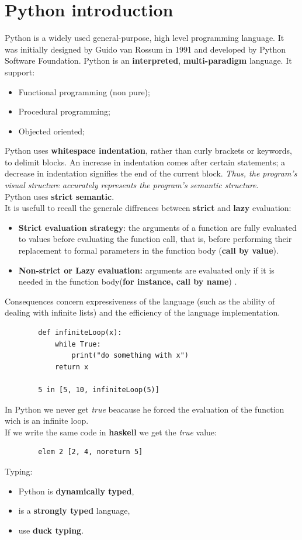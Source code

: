 \documentclass[12pt]{article}
\begin{document}
\section{Python introduction}
	Python is a widely used general-purpose, high level programming language. It was initially designed by Guido van Rossum in 1991 and developed by Python Software Foundation. Python is an \textbf{interpreted}, \textbf{multi-paradigm} language. It support:
	\begin{itemize}
		\item Functional programming (non pure);
		\item Procedural programming;
		\item Objected oriented;
	\end{itemize} 
	Python uses \textbf{whitespace indentation}, rather than curly brackets or keywords, to delimit blocks. An increase in indentation comes after certain statements; a decrease in indentation signifies the end of the current block. \textit{Thus, the program's visual structure accurately represents the program's semantic structure}.\\
	Python uses \textbf{strict semantic}. \\
	It is usefull to recall the generale diffrences between \textbf{strict} and \textbf{lazy} evaluation:
	\begin{itemize}
		\item \textbf{Strict evaluation strategy}: the arguments of a function are fully evaluated to values before evaluating the function call, that is, before performing their replacement to formal parameters in the function body (\textbf{call by
		value}).
		\item \textbf{Non-strict or Lazy evaluation:} arguments are evaluated only if it is needed
		in the function body(\textbf{for instance, call by name}) .
	\end{itemize}
	Consequences concern expressiveness of the language (such as the ability of
	dealing with infinite lists) and the efficiency of the language implementation.
	\begin{lstlisting}
		def infiniteLoop(x):
			while True:
				print("do something with x")
			return x
		
		5 in [5, 10, infiniteLoop(5)]
	\end{lstlisting}
	In Python we never get \textit{true} beacause  he forced the evaluation of the function wich is an infinite loop.\\
	If we write the same code in \textbf{haskell} we get the \textit{true} value:
	\begin{lstlisting}
		elem 2 [2, 4, noreturn 5]
	\end{lstlisting}
	Typing:
	\begin{itemize}
		\item Python is \textbf{ dynamically typed},
		\item is a \textbf{strongly typed} language,
		\item use \textbf{duck typing}.
	\end{itemize}
\end{document}
